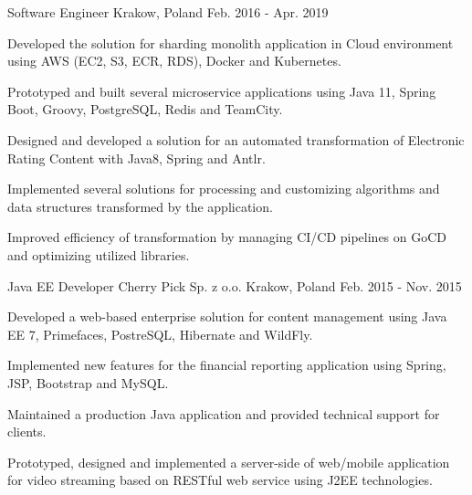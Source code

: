 \begin{cventries}
  \cventry
    {Software Engineer} %
    { } %
    {Krakow, Poland} %
    {Feb. 2016 - Apr. 2019} %
    {
      \begin{cvitems} %
        \item {Developed the solution for sharding monolith application in Cloud environment using AWS (EC2, S3, ECR, RDS), Docker and Kubernetes.}
        \item {Prototyped and built several microservice applications using Java 11, Spring Boot, Groovy, PostgreSQL, Redis and TeamCity.}
        \item {Designed and developed a solution for an automated transformation of Electronic Rating Content with Java8, Spring and Antlr.}
        \item {Implemented several solutions for processing and customizing algorithms and data structures transformed by the application.}
        \item {Improved efficiency of transformation by managing CI/CD pipelines on GoCD and optimizing utilized libraries.}
      \end{cvitems}
    }

  \cventry
    {Java EE Developer} %
    {Cherry Pick Sp. z o.o.} %
    {Krakow, Poland} %
    {Feb. 2015 - Nov. 2015} %
    {
      \begin{cvitems} %
        \item {Developed a web-based enterprise solution for content management using
Java EE 7, Primefaces, PostreSQL, Hibernate and WildFly.}
		\item {Implemented new features for the financial reporting application using Spring, JSP, Bootstrap and MySQL.}
		\item {Maintained a production Java application and provided technical support for clients.}
        \item {Prototyped, designed and implemented a server-side of web/mobile
application for video streaming based on RESTful web service using J2EE technologies.}
      \end{cvitems}
    }


\end{cventries}
